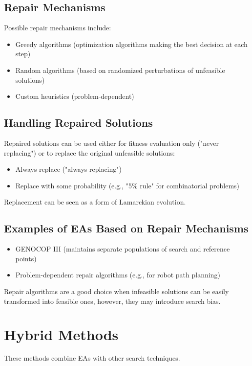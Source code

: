 \subsection*{Repair Mechanisms}

Possible repair mechanisms include:

\begin{itemize}
    \item Greedy algorithms (optimization algorithms making the best decision at each step)
    \item Random algorithms (based on randomized perturbations of unfeasible solutions)
    \item Custom heuristics (problem-dependent)
\end{itemize}

\subsection*{Handling Repaired Solutions}

Repaired solutions can be used either for fitness evaluation only ("never replacing") or to replace the original unfeasible solutions:
\begin{itemize}
    \item Always replace ("always replacing")
    \item Replace with some probability (e.g., "5\% rule" for combinatorial problems)
\end{itemize}
Replacement can be seen as a form of Lamarckian evolution.

\subsection*{Examples of EAs Based on Repair Mechanisms}

\begin{itemize}
    \item GENOCOP III (maintains separate populations of search and reference points)
    \item Problem-dependent repair algorithms (e.g., for robot path planning)
\end{itemize}
Repair algorithms are a good choice when infeasible solutions can be easily transformed into feasible ones, however, they may introduce search bias.

\section{Hybrid Methods}
These methods combine EAs with other search techniques.

